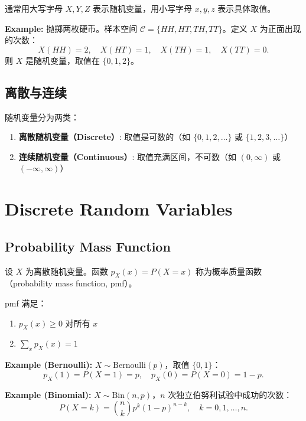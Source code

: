 通常用大写字母 $X, Y, Z$ 表示随机变量，用小写字母 $x, y, z$ 表示具体取值。

\bigskip

\textbf{Example:} 抛掷两枚硬币。样本空间 $\mathcal{C} = \{HH, HT, TH, TT\}$。定义 $X$ 为正面出现的次数：
\[
X(HH) = 2, \quad X(HT) = 1, \quad X(TH) = 1, \quad X(TT) = 0.
\]
则 $X$ 是随机变量，取值在 $\{0, 1, 2\}$。

\subsection{离散与连续}\label{sub:discrete-continuous}

随机变量分为两类：

\begin{enumerate}
    \item \textbf{离散随机变量（Discrete）}: 取值是可数的（如 $\{0,1,2,\ldots\}$ 或 $\{1,2,3,\ldots\}$）
    \item \textbf{连续随机变量（Continuous）}: 取值充满区间，不可数（如 $(0, \infty)$ 或 $(-\infty, \infty)$）
\end{enumerate}

\section{Discrete Random Variables}\label{sec:discrete-rv}

\subsection{Probability Mass Function}\label{sub:pmf}

\begin{Definition}[概率质量函数]\label{def:pmf}
设 $X$ 为离散随机变量。函数 $p_X(x) = P(X = x)$ 称为概率质量函数（probability mass function, pmf）。
\end{Definition}

pmf 满足：
\begin{enumerate}
    \item $p_X(x) \geq 0$ 对所有 $x$
    \item $\sum_{x} p_X(x) = 1$
\end{enumerate}

\textbf{Example (Bernoulli):} $X \sim \text{Bernoulli}(p)$，取值 $\{0, 1\}$：
\[
p_X(1) = P(X = 1) = p, \quad p_X(0) = P(X = 0) = 1-p.
\]

\textbf{Example (Binomial):} $X \sim \text{Bin}(n, p)$，$n$ 次独立伯努利试验中成功的次数：
\[
P(X = k) = \binom{n}{k} p^k (1-p)^{n-k}, \quad k = 0, 1, \ldots, n.
\]

